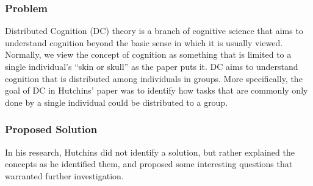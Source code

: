 \subsubsection{Problem}
Distributed Cognition (DC) theory is a branch of cognitive science that aims to understand cognition beyond the basic sense in which it is usually viewed. Normally, we view the concept of cognition as something that is limited to a single individual's ``skin or skull'' as the paper puts it. DC aims to understand cognition that is distributed among individuals in groups. More specifically, the goal of DC in Hutchins' paper was to identify how tasks that are commonly only done by a single individual could be distributed to a group.

\subsubsection{Proposed Solution}
In his research, Hutchins did not identify a solution, but rather explained the concepts as he identified them, and proposed some interesting questions that warranted further investigation.

